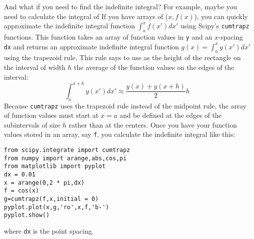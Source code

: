 And what if you need to find the indefinite integral? For example,
maybe you need to calculate the integral of If you have arrays of
($x,f(x)$), you can quickly approximate the indefinite integral function
$\int_a^x f(x') dx'$ using Scipy's {\tt cumtrapz} functions.
 This function takes an array of function
values in {\tt y} and an $x$-spacing {\tt dx} and returns an approximate
indefinite integral function $g(x)=\int_a^x y(x') dx'$ using the trapezoid
rule. This rule says to use as the height of the rectangle on the interval of
width $h$ the average of the function values on the edges of the interval:
\begin{equation}
\int_x^{x+h} y(x') dx' \approx \frac{y(x)+y(x+h) }{ 2} h
\end{equation}
Because \texttt{cumtrapz} uses the trapezoid rule instead of the midpoint
rule, the array of function values must start at $x=a$ and be defined at the
edges of the subintervals of size $h$ rather than at the centers.  Once you
have your function values stored in an array, say \texttt{f}, you calculate
the indefinite integral like this:
\begin{Verbatim}
from scipy.integrate import cumtrapz
from numpy import arange,abs,cos,pi
from matplotlib import pyplot
dx = 0.01
x = arange(0,2 * pi,dx)
f = cos(x)
g=cumtrapz(f,x,initial = 0)
pyplot.plot(x,g,'ro',x,f,'b-')
pyplot.show()
\end{Verbatim}
where \texttt{dx} is the point spacing.


